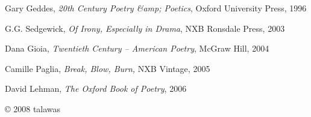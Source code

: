 \documentclass[../main.tex]{subfiles}
\begin{document}
\begin{multicols}{2}
Gary Geddes,\textit{ 20th Century Poetry &amp; Poetics}, Oxford University Press, 1996  
 
G.G. Sedgewick, \textit{Of Irony, Especially in Drama}, NXB Ronsdale Press, 2003 
 
Dana Gioia, \textit{Twentieth Century – American Poetry}, McGraw Hill, 2004 
 
Camille Paglia, \textit{Break, Blow, Burn,} NXB Vintage, 2005  
 
David Lehman, \textit{The Oxford Book of Poetry}, 2006 
 
 
© 2008 talawas 




\end{multicols}
\end{document}
